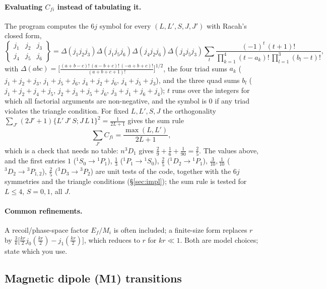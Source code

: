 \documentclass[11pt,a4paper]{article}
\numberwithin{equation}{section}
\theoremstyle{definition}
\theoremstyle{plain}
\theoremstyle{remark}
\numberwithin{algorithm}{section}
\begin{document}
\paragraph{Evaluating $C_{fi}$ instead of tabulating it.} The program computes the $6j$ symbol for every $(L,L',S,J,J')$ with Racah's closed form,
\begin{equation}\label{eq:Racah}
\begin{Bmatrix}j_1&j_2&j_3\\j_4&j_5&j_6\end{Bmatrix}=\Delta(j_1j_2j_3)\Delta(j_1j_5j_6)\Delta(j_4j_2j_6)\Delta(j_4j_5j_3)\sum_t\frac{(-1)^t\,(t+1)!}{\prod_{k=1}^{4}(t-a_k)!\,\prod_{l=1}^{3}(b_l-t)!},
\end{equation}
with $\Delta(abc)=\big[\frac{(a+b-c)!\,(a-b+c)!\,(-a+b+c)!}{(a+b+c+1)!}\big]^{1/2}$, the four triad sums $a_k$ ($j_1{+}j_2{+}j_3$, $j_1{+}j_5{+}j_6$, $j_4{+}j_2{+}j_6$, $j_4{+}j_5{+}j_3$), and the three quad sums $b_l$ ($j_1{+}j_2{+}j_4{+}j_5$, $j_2{+}j_3{+}j_5{+}j_6$, $j_3{+}j_1{+}j_6{+}j_4$); $t$ runs over the integers for which all factorial arguments are non-negative, and the symbol is $0$ if any triad violates the triangle condition. For fixed $L,L',S,J$ the orthogonality $\sum_{J'}(2J'+1)\{L'\,J'\,S;J\,L\,1\}^2=\frac1{2L+1}$ gives the sum rule
\begin{equation}\label{eq:E1sumrule}
\sum_{J'}C_{fi}=\frac{\max(L,L')}{2L+1},
\end{equation}
which is a check that needs no table: $n^3D_1$ gives $\frac29+\frac16+\frac1{90}=\frac25$. The values above, and the first entries $1$ ($^1S_0\to{}^1P_1$), $\frac13$ ($^1P_1\to{}^1S_0$), $\frac25$ ($^1D_2\to{}^1P_1$), $\frac3{10},\frac1{10}$ ($^3D_2\to{}^3P_{1,2}$), $\frac25$ ($^3D_3\to{}^3P_2$) are unit tests of the code, together with the $6j$ symmetries and the triangle conditions (\S\ref{sec:impl}); the sum rule is tested for $L\le4$, $S=0,1$, all $J$.
\paragraph{Common refinements.} A recoil/phase-space factor $E_f/M_i$ is often included; a finite-size form replaces $r$ by $\frac3k\big[\frac{kr}2j_0(\frac{kr}2)-j_1(\frac{kr}2)\big]$, which reduces to $r$ for $kr\ll1$. Both are model choices; state which you use.

\subsection{Magnetic dipole (M1) transitions}
\end{document}
